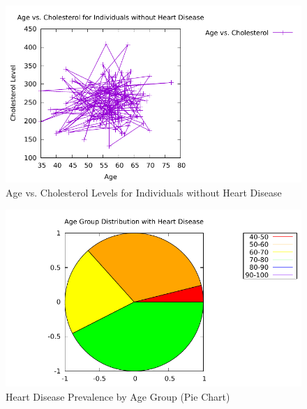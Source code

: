 \documentclass{article}
\begin{document}
	\begin{figure}[h]
		\centering
		\caption{\label{fig:age_cholesterol_no_disease}Age vs. Cholesterol Levels for Individuals without Heart Disease}
		\includegraphics[scale=0.7]{age_cholesterol_chart.pdf}
	\end{figure}
	
	\begin{figure}[h]
		\centering
		\caption{\label{fig:age_group_distribution}Heart Disease Prevalence by Age Group (Pie Chart)}
		\includegraphics[scale=0.7]{age_groups_chart.pdf}
	\end{figure}
	
\end{document}

